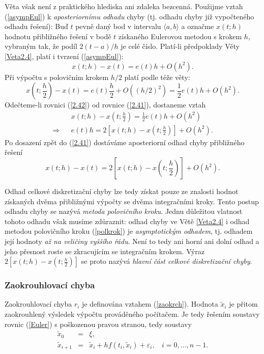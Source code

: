 \documentclass[a4paper, 12pt]{book}
\theoremstyle{definition}
\begin{document}
Věta však není z praktického hlediska ani zdaleka bezcenná. Použijme
vztah (\ref{asympEul}) k {\em aposteriornímu odhadu} chyby (tj. odhadu
chyby již vypočteného odhadu řešení): Buď $t$ pevně daný bod v intervalu
$\langle a,b\rangle$ a označme $x(t;h)$ hodnotu přibližného řešení v bodě 
$t$ získaného Eulerovou metodou s krokem $h$, vybraným tak, že
podíl $2(t-a)/h$ je celé číslo. Platí-li předpoklady Věty
\ref{Veta2.4}, platí i tvrzení (\ref{asympEul}):
\begin{equation}\label{2.41}
x(t;h)-x(t)=e(t)h+O(h^2).
\end{equation}
Při výpočtu s polovičním krokem $h/2$ platí podle téže věty:
\begin{equation}\label{2.42}
x(t;\frac h2)-x(t)=e(t)\frac h2+O((h/2)^2)=\frac 12 e(t)h+O(h^2).
\end{equation}
Odečteme-li rovnici (\ref{2.42}) od rovnice (\ref{2.41}), dostaneme vztah
\begin{eqnarray*}
&&x(t;h)-x(t;\frac h2)=\frac 12 e(t)h+O(h^2)\\
\Rightarrow&& e(t)h=2[x(t;h)-x(t;\frac h2)]+O(h^2).
\end{eqnarray*}
Po dosazení zpět do (\ref{2.41}) dostáváme aposteriorní odhad chyby 
přibližného řešení
\begin{equation}\label{polkrok}
x(t;h)-x(t)=2[x(t;h)-x(t;\frac h2)]+O(h^2).
\end{equation}

Odhad celkové diskretizační chyby lze tedy získat pouze ze znalosti
hodnot získaných dvěma přibližnými výpočty se dvěma integračními kroky.
Tento postup odhadu chyby se nazývá {\em metoda polovičního kroku}.
Jednu důležitou vlatnost tohoto odhadu však musíme zdůraznit: odhad
chyby ve Větě \ref{Veta2.4} i odhad metodou polovičního kroku 
(\ref{polkrok}) je {\em asymptotickým odhadem}, tj. odhadem její
hodnoty {\em až na veličiny vyššího řádu}. Není to tedy ani horní ani
dolní odhad a jeho přesnost roste se zkracujícím se integračním krokem.
Výraz $2[x(t;h)-x(t;\frac h2)]$ se proto nazývá {\em hlavní část
celkové diskretizační chyby}.

\subsubsection{Zaokrouhlovací chyba}
Zaokrouhlovací chyba $r_i$ je definována vztahem (\ref{zaokrch}). 
Hodnota $\tilde x_i$ je přitom zaokrouhlený výsledek výpočtu prováděného
počítačem. Je tedy řešením soustavy rovnic (\ref{Euler}) s poškozenou pravou
stranou, tedy soustavy
\begin{equation}\label{poskEuler}
\begin{array}{crl}
\tilde x_0 & =& \xi,\\
\tilde x_{i+1} &=&\tilde x_i+h f(t_i,\tilde x_i) + \varepsilon_i,~~~~ i=0,\dots,n-1.
\end{array}
\end{equation}
\end{document}
